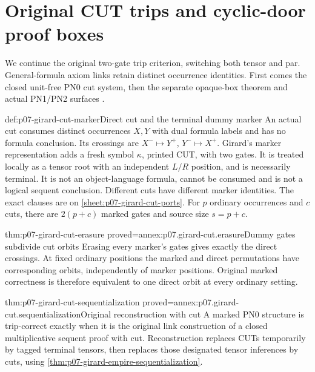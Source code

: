 \section{Original CUT trips and cyclic-door proof boxes}
\label{sec:p07-girard-cut-boxes}

We continue the original two-gate trip criterion, switching both tensor
and par. General-formula axiom links retain distinct occurrence identities.
First comes the closed unit-free PN0 cut system, then the separate
opaque-box theorem and actual PN1/PN2 surfaces
\cite[Sections~2.2--2.5, pp.~40--47]{Girard1987AuthorHosted}.

\begin{hbdefinition}{def:p07-girard-cut-marker}{Direct cut and the terminal dummy marker}
An actual cut consumes distinct occurrences \(X,Y\) with dual formula
labels and has no formula conclusion.
Its crossings are \(X^-\mapsto Y^+\), \(Y^-\mapsto X^+\).
Girard's marker representation adds a fresh symbol \(\kappa\), printed
CUT, with two gates. It is treated locally as a tensor root with an
independent \(L/R\) position, and is necessarily terminal.
It is not an object-language formula, cannot be consumed and is not
a logical sequent conclusion. Different cuts have different marker
identities. The exact clauses are on \cref{sheet:p07-girard-cut-ports}.
For \(p\) ordinary occurrences and \(c\) cuts, there are \(2(p+c)\)
marked gates and source size \(s=p+c\).
\end{hbdefinition}

\begin{hblemma}{thm:p07-girard-cut-erasure}
 {proved=annex:p07.girard-cut.erasure}{Dummy gates subdivide cut orbits}
Erasing every marker's gates gives exactly the direct crossings.
At fixed ordinary positions the marked and direct permutations have
corresponding orbits, independently of marker positions.
Original marked correctness is therefore equivalent to one direct
orbit at every ordinary setting.
\end{hblemma}

\begin{hbtheorem}{thm:p07-girard-cut-sequentialization}
 {proved=annex:p07.girard-cut.sequentialization}{Original reconstruction with cut}
A marked PN0 structure is trip-correct exactly when it is the original
link construction of a closed multiplicative sequent proof with cut.
Reconstruction replaces CUTs temporarily by tagged terminal tensors,
then replaces those designated tensor inferences by cuts, using
\cref{thm:p07-girard-empire-sequentialization}.
\end{hbtheorem}

